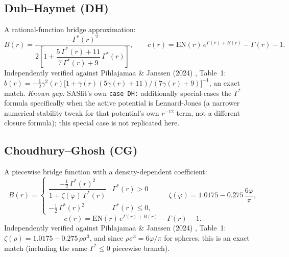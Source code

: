 \documentclass[11pt,a4paper]{article}
\newcommand{\code}[1]{\texttt{#1}}
\begin{document}
\subsection{Duh--Haymet (DH) \cite{duhhaymet1995}}
A rational-function bridge approximation:
\begin{equation}
  B(r) = \frac{-\Gamma^*(r)^2}{2\left[1+\dfrac{5\,\Gamma^*(r)+11}{7\,\Gamma^*(r)+9}\,\Gamma^*(r)\right]}, \qquad
  c(r) = \mathrm{EN}(r)\,e^{\Gamma(r)+B(r)} - \Gamma(r) - 1.
\end{equation}
Independently verified against Pihlajamaa \& Janssen (2024)
\cite{pihlajamaa2024}, Table~1: $b(r)=-\tfrac12\gamma^2(r)\big[1+\gamma(r)(5\gamma(r)+11)/(7\gamma(r)+9)\big]^{-1}$,
an exact match. \emph{Known gap:} SASfit's own \code{case DH:} additionally
special-cases the $\Gamma^*$ formula specifically when the active potential is
Lennard-Jones (a narrower numerical-stability tweak for that potential's own
$r^{-12}$ term, not a different closure formula); this special case is not
replicated here.

\subsection{Choudhury--Ghosh (CG) \cite{choudhuryghosh2002}}
A piecewise bridge function with a density-dependent coefficient:
\begin{equation}
  B(r) = \begin{cases} \dfrac{-\tfrac12\,\Gamma^*(r)^2}{1+\zeta(\varphi)\,\Gamma^*(r)} & \Gamma^*(r)>0\\[2ex]
    -\tfrac12\,\Gamma^*(r)^2 & \Gamma^*(r)\le0, \end{cases}
  \qquad \zeta(\varphi) = 1.0175 - 0.275\,\frac{6\varphi}{\pi},
\end{equation}
\begin{equation}
  c(r) = \mathrm{EN}(r)\,e^{\Gamma(r)+B(r)} - \Gamma(r) - 1.
\end{equation}
Independently verified against Pihlajamaa \& Janssen (2024)
\cite{pihlajamaa2024}, Table~1: $\zeta(\rho)=1.0175-0.275\,\rho\sigma^3$, and
since $\rho\sigma^3=6\varphi/\pi$ for spheres, this is an exact match
(including the same $\Gamma^*\le0$ piecewise branch).
\end{document}
